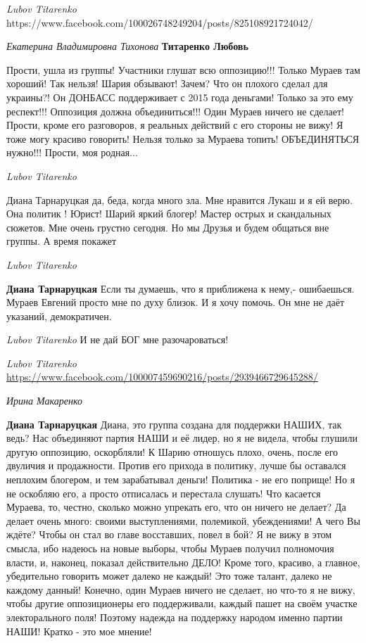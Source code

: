 \emph{Lubov Titarenko}
https://www.facebook.com/100026748249204/posts/825108921724042/

\emph{Екатерина Владимировна Тихонова}
\textbf{Титаренко Любовь}

Прости, ушла из группы! Участники глушат всю оппозицию!!! Только Мураев там хороший! Так нельзя! Шария обзывают! Зачем? Что он плохого сделал для украины?! Он ДОНБАСС поддерживает с 2015 года деньгами! Только за это ему респект!!! Оппозиция должна объединиться!!! Один Мураев ничего не сделает! Прости, кроме его разговоров, я реальных действий с его стороны не вижу! Я тоже могу красиво говорить! Нельзя только за Мураева топить! ОБЪЕДИНЯТЬСЯ нужно!!! Прости, моя родная...

\emph{Lubov Titarenko}

Диана Тарнаруцкая да, беда, когда много зла. Мне нравится Лукаш и я ей верю. Она политик ! Юрист!
Шарий яркий блогер! Мастер острых и скандальных сюжетов.
Мне очень грустно сегодня.
Но мы Друзья и будем общаться вне группы. А время покажет

\emph{Lubov Titarenko}

\textbf{Диана Тарнаруцкая} Если ты думаешь, что я приближена к нему,- ошибаешься. Мураев
Евгений просто мне по духу близок. И я хочу помочь. Он мне не даёт указаний,
демократичен.

\emph{Lubov Titarenko}
И не дай БОГ мне разочароваться!

\emph{Lubov Titarenko}
\url{https://www.facebook.com/100007459690216/posts/2939466729645288/}

\emph{Ирина Макаренко}

\textbf{Диана Тарнаруцкая} Диана, это группа создана для поддержки НАШИХ, так ведь?
Нас объединяют партия НАШИ и её лидер, но я не видела, чтобы глушили другую оппозицию, оскорбляли!
К Шарию отношусь плохо, очень, после его двуличия и продажности. Против его прихода в политику, лучше бы оставался неплохим блогером, и тем зарабатывал деньги!
Политика - не его поприще!
Но я не оскобляю его, а просто отписалась и перестала слушать!
Что касается Мураева, то, честно, сколько можно упрекать его, что он ничего не делает?
Да делает очень много: своими выступлениями, полемикой, убеждениями!
А чего Вы ждёте? Чтобы он стал во главе восставших, повел в бой?
Я не вижу в этом смысла, ибо надеюсь на новые выборы, чтобы Мураев получил полномочия власти, и, наконец, показал действительно ДЕЛО!
Кроме того, красиво, а главное, убедительно говорить может далеко не каждый! Это тоже талант, далеко не каждому данный!
Конечно, один Мураев ничего не сделает, но что-то я не вижу, чтобы другие оппозиционеры его поддерживали, каждый пашет на своём участке электорального поля!
Поэтому надежда на поддержку народом именно партии НАШИ!
Кратко - это мое мнение!

